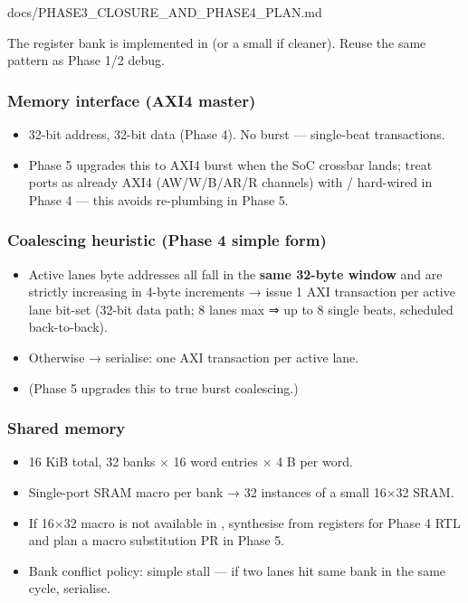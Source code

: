 \begin{relocated}{docs/PHASE3_CLOSURE_AND_PHASE4_PLAN.md}
{}

The register bank is implemented in  (or a small
 if cleaner). Reuse the same
 pattern as Phase 1/2 debug.

\subsubsection{Memory interface (AXI4 master)}\label{ds:ch:phase3-closure-phase4-plan:55-memory-interface-axi4-master}

\begin{itemize}
\tightlist
\item
  32-bit address, 32-bit data (Phase 4). No burst --- single-beat
  transactions.
\item
  Phase 5 upgrades this to AXI4 burst when the SoC crossbar lands; treat
   ports as already AXI4
  (AW/\allowbreak{}W/\allowbreak{}B/\allowbreak{}AR/\allowbreak{}R
  channels) with / hard-wired in Phase 4 ---
  this avoids re-plumbing in Phase 5.
\end{itemize}

\subsubsection{Coalescing heuristic (Phase 4 simple form)}\label{ds:ch:phase3-closure-phase4-plan:56-coalescing-heuristic-phase-4-simple-form}

\begin{itemize}
\tightlist
\item
  Active lanes\textquotesingle{} byte addresses all fall in the
  \textbf{same 32-byte window} and are strictly increasing in 4-byte
  increments → issue 1 AXI transaction per active lane bit-set (32-bit
  data path; 8 lanes max ⇒ up to 8 single beats, scheduled
  back-to-back).
\item
  Otherwise → serialise: one AXI transaction per active lane.
\item
  (Phase 5 upgrades this to true burst coalescing.)
\end{itemize}

\subsubsection{Shared memory}\label{ds:ch:phase3-closure-phase4-plan:57-shared-memory}

\begin{itemize}
\tightlist
\item
  16 KiB total, 32 banks × 16 word entries × 4 B per word.
\item
  Single-port SRAM macro per bank → 32 instances of a small 16×32 SRAM.
\item
  If 16×32 macro is not available in , synthesise from
  registers for Phase 4 RTL and plan a macro substitution PR in Phase 5.
\item
  Bank conflict policy: simple stall --- if two lanes hit same bank in
  the same cycle, serialise.
\end{itemize}


\end{relocated}
